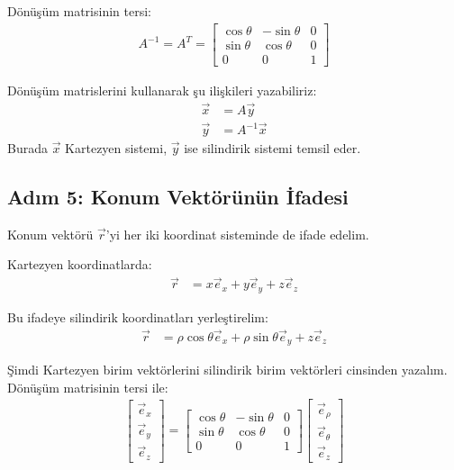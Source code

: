 \documentclass[11pt,letterpaper,twocolumn]{fenbil}
\begin{document}
Dönüşüm matrisinin tersi:
\begin{align}
    A^{-1} = A^T = 
    \begin{bmatrix}
        \cos\theta & -\sin\theta & 0 \\
        \sin\theta & \cos\theta & 0 \\
        0 & 0 & 1
    \end{bmatrix}
\end{align}

Dönüşüm matrislerini kullanarak şu ilişkileri yazabiliriz:
\begin{align}
    \vec{x} &= A\vec{y} \\
    \vec{y} &= A^{-1}\vec{x}
\end{align}
Burada $\vec{x}$ Kartezyen sistemi, $\vec{y}$ ise silindirik sistemi temsil eder.

\subsection*{Adım 5: Konum Vektörünün İfadesi}

Konum vektörü $\vec{r}$'yi her iki koordinat sisteminde de ifade edelim.

Kartezyen koordinatlarda:
\begin{align}
    \vec{r} &= x\vec{e}_x + y\vec{e}_y + z\vec{e}_z
\end{align}

Bu ifadeye silindirik koordinatları yerleştirelim:
\begin{align}
    \vec{r} &= \rho\cos\theta\vec{e}_x + \rho\sin\theta\vec{e}_y + z\vec{e}_z
\end{align}

Şimdi Kartezyen birim vektörlerini silindirik birim vektörleri cinsinden yazalım. Dönüşüm matrisinin tersi ile:
\begin{align}
    \begin{bmatrix}
        \vec{e}_x \\
        \vec{e}_y \\
        \vec{e}_z
    \end{bmatrix} = 
    \begin{bmatrix}
        \cos\theta & -\sin\theta & 0 \\
        \sin\theta & \cos\theta & 0 \\
        0 & 0 & 1
    \end{bmatrix}
    \begin{bmatrix}
        \vec{e}_\rho \\
        \vec{e}_\theta \\
        \vec{e}_z
    \end{bmatrix}
\end{align}
\end{document}
